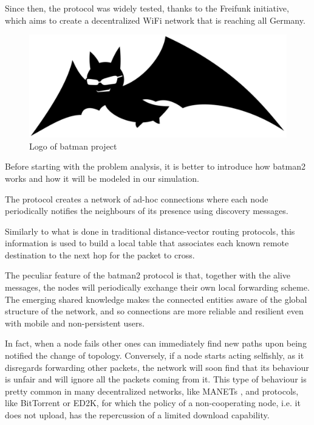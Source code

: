\documentclass[conference,10.5pt]{IEEEtran}
\begin{document}
Since then, the protocol was widely tested,  thanks to the Freifunk initiative, which aims to create a decentralized WiFi network that is reaching all Germany.

\begin{figure}[h]
  \centering
  \includegraphics[width=0.8\linewidth]{figures/logo.pdf}
  \caption{Logo of \gls{batman} project}
  \label{fig:batman_logo}
\end{figure}

\smallskip

Before starting with the problem analysis, it is better to introduce how \gls{batman2} works and how it will be modeled in our simulation.

The protocol creates a network of ad-hoc connections where each node periodically notifies the neighbours of its presence using discovery messages.

Similarly to what is done in traditional distance-vector routing protocols, this information is used to build a local table that associates each known remote destination to the next hop for the packet to cross.

The peculiar feature of the \gls{batman2} protocol is that, together with the alive messages, the nodes will periodically exchange their own local forwarding scheme. The emerging shared knowledge makes the connected entities aware of the global structure of the network, and so connections are more reliable and resilient even with mobile and non-persistent users.

In fact, when a node fails other ones can immediately find new paths upon being notified the change of topology.
Conversely, if a node starts acting selfishly, as it disregards forwarding other packets, the network will soon find that its behaviour is unfair and will ignore all the packets coming from it.
This type of behaviour is pretty common in many decentralized networks, like MANETs \cite{MANETs}, and protocols, like BitTorrent or ED2K, for which the policy of a non-cooperating node, i.e. it does not upload, has the repercussion of a limited download capability.\cite{BitTorrent,ed2k}
\end{document}
